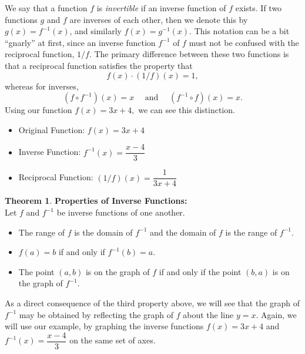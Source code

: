 \documentclass[11pt]{book}
\theoremstyle{definition}  %
\newtheorem{thm}{Theorem}[chapter] %
\newcommand{\bbm}{\begin{boxedminipage}{4.80in}} %
\newcommand{\ebm}{\end{boxedminipage}}
\begin{document}
We say that a function $f$ is \textit{invertible} if an inverse function of $f$ exists.  If two functions $g$ and $f$ are inverses of each other, then we denote this by $g(x)=f^{-1}(x)$, and similarly $f(x)=g^{-1}(x)$.  This notation can be a bit ``gnarly'' at first, since an inverse function $f^{-1}$ of $f$ must not be confused with the reciprocal function, $1/f$.  The primary difference between these two functions is that a reciprocal function satisfies the property that $$f(x)\cdot (1/f)(x)=1,$$ whereas for inverses, $$(f\circ f^{-1})(x)=x \text{~~~~and~~~~} (f^{-1}\circ f)(x)=x.$$
Using our function $f(x)=3x+4,$ we can see this distinction.

\begin{itemize}
	\item Original Function: $f(x)=3x+4$
	\item Inverse Function: $f^{-1}(x)=\dfrac{x-4}{3}$
	\item Reciprocal Function: $(1/f)(x)=\dfrac{1}{3x+4}$
\end{itemize}


\smallskip

\colorbox{ResultColor}{\bbm

\begin{thm}\textbf{Properties of Inverse Functions:}\\ Let $f$ and $f^{-1}$ be inverse functions of one another.  

\begin{itemize}

\item  The range of $f$ is the domain of $f^{-1}$ and the domain of $f$ is the range of $f^{-1}$.

\item  $f(a) = b$ if and only if $f^{-1}(b) = a$.

\item  The point $(a,b)$ is on the graph of $f$ if and only if the point $(b,a)$ is on the graph of $f^{-1}$.

\end{itemize}

\label{inversefunctionprops}

\end{thm}
\ebm}

\smallskip

As a direct consequence of the third property above, we will see that the graph of $f^{-1}$ may be obtained by reflecting the graph of $f$ about the line $y=x$.  Again, we will use our example, by graphing the inverse functions $f(x) = 3x+4$ and $f^{-1}(x) = \dfrac{x-4}{3}$ on the same set of axes.
\end{document}
